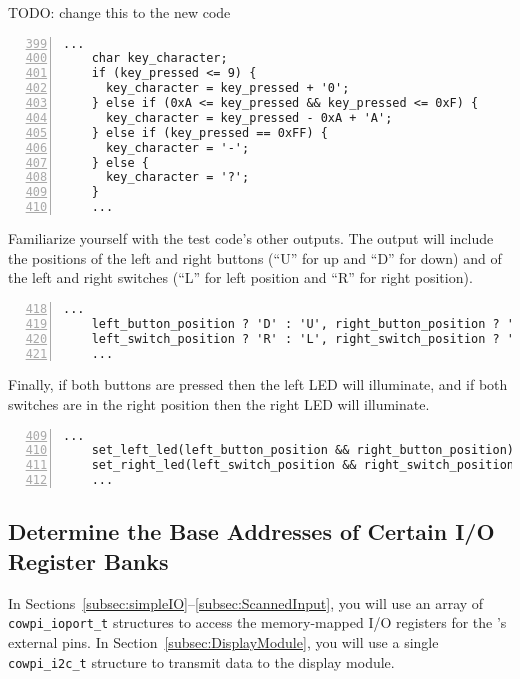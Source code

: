 {\color{red}TODO: change this to the new code}

\begin{lstlisting}[numberstyle=\color{gray}, numbers=left, firstnumber=399]
    ...
    char key_character;
    if (key_pressed <= 9) {
      key_character = key_pressed + '0';
    } else if (0xA <= key_pressed && key_pressed <= 0xF) {
      key_character = key_pressed - 0xA + 'A';
    } else if (key_pressed == 0xFF) {
      key_character = '-';
    } else {
      key_character = '?';
    }
    ...
\end{lstlisting}

Familiarize yourself with the test code's other outputs.
The output will include the positions of the left and right buttons (``U'' for up and ``D'' for down) and of the left and right switches (``L'' for left position and ``R'' for right position).

\begin{lstlisting}[numberstyle=\color{gray}, numbers=left, firstnumber=418]
    ...
    left_button_position ? 'D' : 'U', right_button_position ? 'D' : 'U',
    left_switch_position ? 'R' : 'L', right_switch_position ? 'R' : 'L'
    ...
\end{lstlisting}

Finally, if both buttons are pressed then the left LED will illuminate, and if both switches are in the right position then the right LED will illuminate.

\begin{lstlisting}[numberstyle=\color{gray}, numbers=left, firstnumber=409]
    ...
    set_left_led(left_button_position && right_button_position);
    set_right_led(left_switch_position && right_switch_position);
    ...
\end{lstlisting}


\subsection{Determine the Base Addresses of Certain I/O Register Banks} \label{subsec:baseAddresses}

In Sections~\ref{subsec:simpleIO}--\ref{subsec:ScannedInput}, you will use an array of \lstinline{cowpi_ioport_t} structures to access the memory-mapped I/O registers for the \developmentboard's external pins.
In Section~\ref{subsec:DisplayModule}, you will use a single \lstinline{cowpi_i2c_t} structure to transmit data to the display module.

